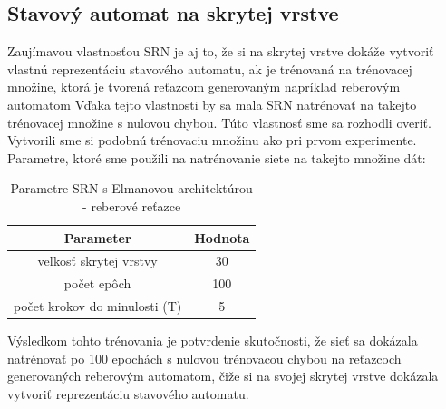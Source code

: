 \subsection{Stavový automat na skrytej vrstve}
Zaujímavou vlastnosťou SRN je aj to, že si na skrytej vrstve dokáže vytvoriť vlastnú reprezentáciu stavového automatu, ak 
je trénovaná na trénovacej množine, ktorá je tvorená reťazcom generovaným napríklad reberovým automatom \cite{Servan-Schreiber1991}
Vďaka tejto vlastnosti by sa mala SRN natrénovať na takejto trénovacej množine s nulovou chybou.
Túto vlastnosť sme sa rozhodli overiť.
Vytvorili sme si podobnú trénovaciu množinu ako pri prvom experimente.
Parametre, ktoré sme použili na natrénovanie siete na takejto množine dát:
\begin{table}[h!]
    \centering
    \begin{tabular}{|c|c|} 
    \hline
    Parameter & Hodnota \\ 
    \hline
    veľkosť skrytej vrstvy & 30  \\
    \hline
    počet epôch & 100  \\
    \hline
    počet krokov do minulosti (T) & 5 \\
    \end{tabular}
    \caption{Parametre SRN s Elmanovou architektúrou - reberové reťazce}
    \label{table:1}
\end{table}
Výsledkom tohto trénovania je potvrdenie skutočnosti, že sieť sa dokázala 
natrénovať po 100 epochách s nulovou trénovacou chybou na reťazcoch generovaných reberovým automatom, 
čiže si na svojej skrytej vrstve dokázala vytvoriť reprezentáciu stavového automatu.






